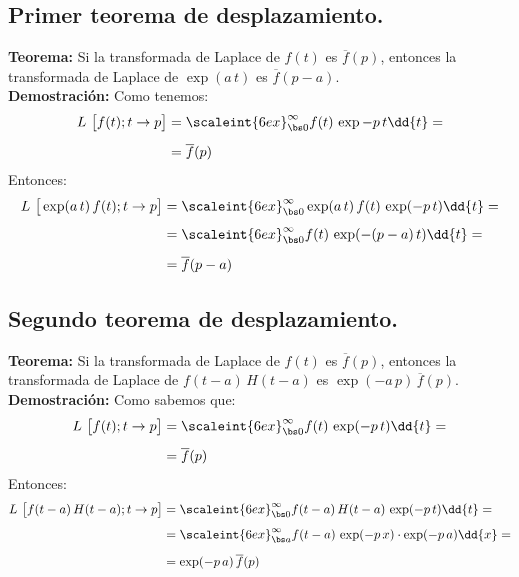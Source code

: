\subsection{Primer teorema de desplazamiento.}

\noindent \textbf{Teorema: } Si la transformada de Laplace de $f(t)$ es $\overline{f}(p)$, entonces la transformada de Laplace de $\exp(a \, t)$ es $\overline{f}(p - a)$.
\\[0.5em]
\textbf{Demostración: } Como tenemos:
\begin{align*}
L \big[f(t); t \to p\big] &= \scaleint{6ex}_{\bs 0}^{\infty} f(t) \, \exp{-p \, t} \dd{t} = \\[0.5em]
&= \overline{f} (p)
\end{align*}
Entonces:
\begin{align}
\begin{aligned}[b]
L \big[\exp (a \, t) \, f(t); t \to p\big] &= \scaleint{6ex}_{\bs 0}^{\infty} \exp(a \, t) \, f(t) \, \exp(-p \, t) \dd{t} = \\[0.5em]
&= \scaleint{6ex}_{\bs 0}^{\infty} f(t) \, \exp(-(p - a) \, t) \dd{t} = \\[0.5em]
&= \overline{f} (p - a)
\end{aligned}
\label{eq:ecuacion_03_07}
\end{align}

\subsection{Segundo teorema de desplazamiento.}

\noindent \textbf{Teorema: } Si la transformada de Laplace de $f(t)$ es $\overline{f}(p)$, entonces la transformada de Laplace de $f(t - a) \, H(t - a)$ es $\exp(-a \, p) \, \overline{f}(p)$.
\\[0.5em]
\textbf{Demostración: } 
Como sabemos que:
\begin{align*}
L \big[f(t); t \to p\big] &= \scaleint{6ex}_{\bs 0}^{\infty} f(t) \, \exp(-p \, t) \dd{t} = \\[0.5em]
&= \overline{f} (p)
\end{align*}
Entonces:
\begin{align}
\begin{aligned}
L \big[f(t - a) \, H (t - a); t \to p\big] &= \scaleint{6ex}_{\bs 0}^{\infty} f(t - a) \, H(t - a) \, \exp(-p \, t) \dd{t} = \\[0.5em]
&= \scaleint{6ex}_{\bs a}^{\infty} f(t - a) \, \exp(-p \, x) \cdot \exp(-p \, a) \dd{x} = \\[0.5em]
&= \exp(-p \, a) \, \overline{f} (p) 
\end{aligned}
\label{eq:ecuacion_03_08}
\end{align}

